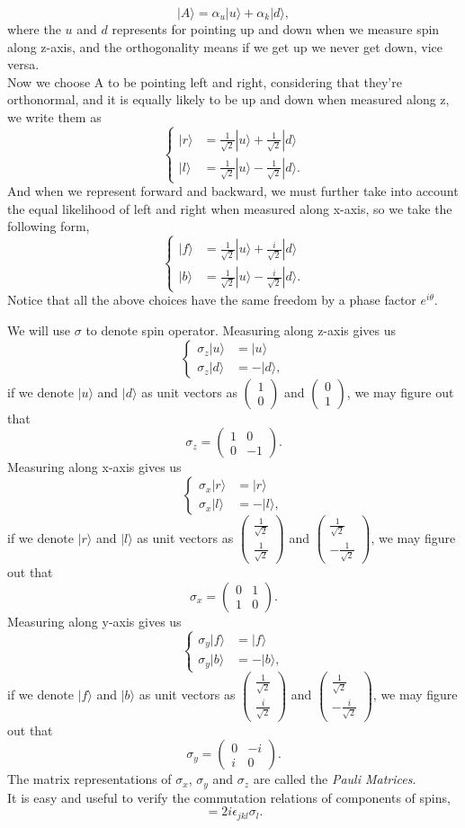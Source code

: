 \documentclass{article}
\newcommand{\be}{\begin{equation}}
\newcommand{\ee}{\end{equation}}
\newcommand{\ba}{\begin{array}}
\newcommand{\ea}{\end{array}}
\newcommand{\1}{\left}
\newcommand{\2}{\right}
\newcommand{\ra}{\rangle}
\newcommand{\al}{\alpha}
\newcommand{\sig}{\sigma}
\newcommand{\ep}{\epsilon}
\begin{document}
\be
|A\ra=\al_u|u\ra+\al_k|d\ra,
\ee
where the $u$ and $d$ represents for pointing up and down when we measure spin along z-axis, and the orthogonality means if we get up we never get down, vice versa.\\
Now we choose A to be pointing left and right, considering that they're orthonormal, and it is equally likely to be up and down when measured along z, we write them as
\be\1\{\begin{split}
|r\ra&=\frac1 {\sqrt{2}}|u\ra+\frac1 {\sqrt{2}}|d\ra\\
|l\ra&=\frac1 {\sqrt{2}}|u\ra- \frac1 {\sqrt{2}}|d\ra.
\end{split}\2.\ee
And when we represent forward and backward, we must further take into account the equal likelihood of left and right when measured along x-axis, so we take the following form,
\be\1\{\begin{split}
|f\ra&=\frac1 {\sqrt{2}}|u\ra+\frac i {\sqrt{2}}|d\ra\\
|b\ra&=\frac1 {\sqrt{2}}|u\ra- \frac i {\sqrt{2}}|d\ra.
\end{split}\2.\ee
Notice that all the above choices have the same freedom by a phase factor $e^{i\theta}$.

We will use $\sig$ to denote spin operator. Measuring along z-axis gives us
\be\1\{\begin{split}
\sig_z |u\ra&=|u\ra\\
\sig_z |d\ra&=-|d\ra,
\end{split}\2.\ee
if we denote $|u\ra$ and $|d\ra$ as unit vectors as $\1(\ba{c}1\\0\ea\2)$ and $\1(\ba{c}0\\1\ea\2)$, we may figure out that
\be
\sig_z=\1(\ba{cc}1&0\\0&-1\ea\2).
\ee
Measuring along x-axis gives us
\be\1\{\begin{split}
\sig_x |r\ra&=|r\ra\\
\sig_x |l\ra&=-|l\ra,
\end{split}\2.\ee
if we denote $|r\ra$ and $|l\ra$ as unit vectors as $\1(\ba{c}\frac1{\sqrt{2}}\\\frac1{\sqrt{2}}\ea\2)$ and $\1(\ba{c}\frac1{\sqrt{2}}\\-\frac1{\sqrt{2}}\ea\2)$, we may figure out that
\be
\sig_x=\1(\ba{cc}0&1\\1&0\ea\2).
\ee
Measuring along y-axis gives us
\be\1\{\begin{split}
\sig_y |f\ra&=|f\ra\\
\sig_y |b\ra&=-|b\ra,
\end{split}\2.\ee
if we denote $|f\ra$ and $|b\ra$ as unit vectors as $\1(\ba{c}\frac1{\sqrt{2}}\\\frac i{\sqrt{2}}\ea\2)$ and $\1(\ba{c}\frac1{\sqrt{2}}\\-\frac i{\sqrt{2}}\ea\2)$, we may figure out that
\be
\sig_y=\1(\ba{cc}0&-i\\i&0\ea\2).
\ee
The matrix representations of $\sig_x$, $\sig_y$ and $\sig_z$ are called the \textit{Pauli Matrices}.\\
It is easy and useful to verify the commutation relations of components of spins,
\be
[\sig_j,\sig_k]=2i\ep_{jkl}\sig_l.
\ee
\end{document}
